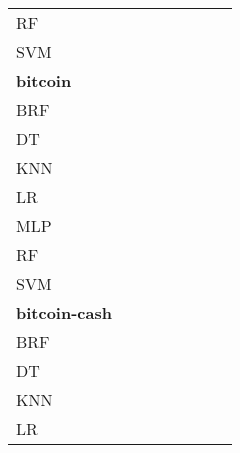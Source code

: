 \documentclass{article}
\begin{document}
{\begin{tabular}{|l|c|c|c|c|c|c|c|}
RF & \cellcolor{white}  & \cellcolor{white}  & \cellcolor{white}  & \cellcolor{black}  & \cellcolor{black}  & \cellcolor{gray}  & \cellcolor{black}  \\ 
SVM & \cellcolor{white}  & \cellcolor{white}  & \cellcolor{white}  & \cellcolor{white}  & \cellcolor{white}  & \cellcolor{white}  & \cellcolor{gray}  \\ 
\hline
\textbf{bitcoin} \\ \hline
BRF & \cellcolor{gray}  & \cellcolor{black}  & \cellcolor{black}  & \cellcolor{white}  & \cellcolor{black}  & \cellcolor{white}  & \cellcolor{black}  \\ 
DT & \cellcolor{white}  & \cellcolor{gray}  & \cellcolor{white}  & \cellcolor{black}  & \cellcolor{black}  & \cellcolor{white}  & \cellcolor{black}  \\ 
KNN & \cellcolor{white}  & \cellcolor{black}  & \cellcolor{gray}  & \cellcolor{black}  & \cellcolor{white}  & \cellcolor{white}  & \cellcolor{black}  \\ 
LR & \cellcolor{white}  & \cellcolor{white}  & \cellcolor{white}  & \cellcolor{gray}  & \cellcolor{white}  & \cellcolor{white}  & \cellcolor{white}  \\ 
MLP & \cellcolor{white}  & \cellcolor{white}  & \cellcolor{white}  & \cellcolor{white}  & \cellcolor{gray}  & \cellcolor{white}  & \cellcolor{white}  \\ 
RF & \cellcolor{white}  & \cellcolor{white}  & \cellcolor{black}  & \cellcolor{black}  & \cellcolor{black}  & \cellcolor{gray}  & \cellcolor{black}  \\ 
SVM & \cellcolor{white}  & \cellcolor{white}  & \cellcolor{white}  & \cellcolor{black}  & \cellcolor{white}  & \cellcolor{white}  & \cellcolor{gray}  \\ 
\hline
\textbf{bitcoin-cash} \\ \hline
BRF & \cellcolor{gray}  & \cellcolor{white}  & \cellcolor{white}  & \cellcolor{white}  & \cellcolor{black}  & \cellcolor{white}  & \cellcolor{black}  \\ 
DT & \cellcolor{white}  & \cellcolor{gray}  & \cellcolor{white}  & \cellcolor{white}  & \cellcolor{black}  & \cellcolor{white}  & \cellcolor{white}  \\ 
KNN & \cellcolor{white}  & \cellcolor{white}  & \cellcolor{gray}  & \cellcolor{white}  & \cellcolor{black}  & \cellcolor{white}  & \cellcolor{white}  \\ 
LR & \cellcolor{white}  & \cellcolor{white}  & \cellcolor{white}  & \cellcolor{gray}  & \cellcolor{black}  & \cellcolor{white}  & \cellcolor{white}  \\ 

\end{tabular}}
\end{document}
